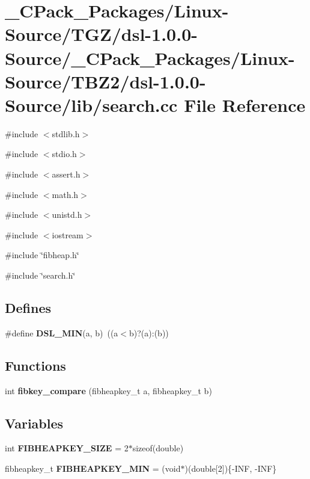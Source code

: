 \section{\_\-CPack\_\-Packages/Linux-\/Source/TGZ/dsl-\/1.0.0-\/Source/\_\-CPack\_\-Packages/Linux-\/Source/TBZ2/dsl-\/1.0.0-\/Source/lib/search.cc File Reference}
\label{__CPack__Packages_2Linux-Source_2TGZ_2dsl-1_80_80-Source_2__CPack__Packages_2Linux-Source_2TBZ2_2e658960b2dc3d0e624ee054f6b551bd}
{\ttfamily \#include $<$stdlib.h$>$}\par
{\ttfamily \#include $<$stdio.h$>$}\par
{\ttfamily \#include $<$assert.h$>$}\par
{\ttfamily \#include $<$math.h$>$}\par
{\ttfamily \#include $<$unistd.h$>$}\par
{\ttfamily \#include $<$iostream$>$}\par
{\ttfamily \#include \char`\"{}fibheap.h\char`\"{}}\par
{\ttfamily \#include \char`\"{}search.h\char`\"{}}\par
\subsection*{Defines}
\begin{DoxyCompactItemize}
\item 
\#define {\bf DSL\_\-MIN}(a, b)~((a$<$b)?(a):(b))
\end{DoxyCompactItemize}
\subsection*{Functions}
\begin{DoxyCompactItemize}
\item 
int {\bf fibkey\_\-compare} (fibheapkey\_\-t a, fibheapkey\_\-t b)
\end{DoxyCompactItemize}
\subsection*{Variables}
\begin{DoxyCompactItemize}
\item 
int {\bf FIBHEAPKEY\_\-SIZE} = 2$\ast$sizeof(double)
\item 
fibheapkey\_\-t {\bf FIBHEAPKEY\_\-MIN} = (void$\ast$)(double[2])\{-\/INF, -\/INF\}
\end{DoxyCompactItemize}


